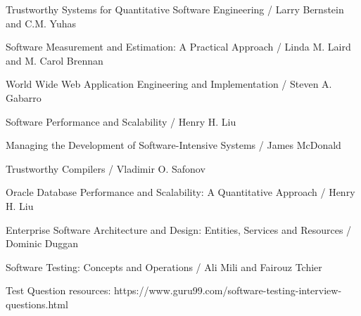 Trustworthy Systems for Quantitative Software Engineering / Larry Bernstein and C.M. Yuhas

Software Measurement and Estimation: A Practical Approach / Linda M. Laird and M. Carol Brennan

World Wide Web Application Engineering and Implementation / Steven A. Gabarro

Software Performance and Scalability / Henry H. Liu

Managing the Development of Software-Intensive Systems / James McDonald

Trustworthy Compilers / Vladimir O. Safonov

Oracle Database Performance and Scalability: A Quantitative Approach / Henry H. Liu

Enterprise Software Architecture and Design: Entities, Services and Resources / Dominic Duggan

Software Testing: Concepts and Operations / Ali Mili and Fairouz Tchier


Test Question resources:
https://www.guru99.com/software-testing-interview-questions.html